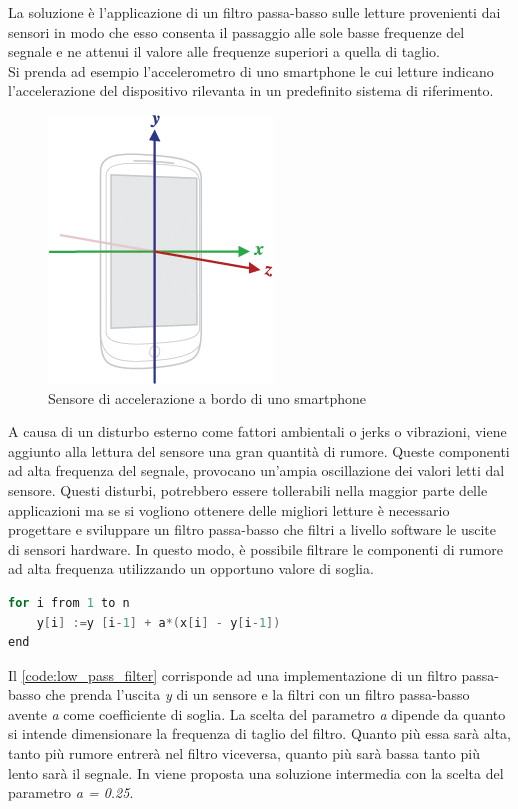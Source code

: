 La soluzione è l'applicazione di un filtro passa-basso sulle letture provenienti dai sensori in modo che esso consenta il passaggio alle sole basse frequenze del segnale e ne attenui il valore alle frequenze superiori a quella di taglio.\\
Si prenda ad esempio l'accelerometro di uno smartphone le cui letture indicano l'accelerazione del dispositivo rilevanta in un predefinito sistema di riferimento.
\begin{figure}
	\begin{center}
		\includegraphics[width=0.3\columnwidth]{images/accelerometer}
	\end{center}
	\caption{Sensore di accelerazione a bordo di uno smartphone}
	\label{fig:accelerometer}
\end{figure}
A causa di un disturbo esterno come fattori ambientali o jerks o vibrazioni, viene aggiunto alla lettura del sensore una gran quantità di rumore. Queste componenti ad alta frequenza del segnale, provocano un'ampia oscillazione dei valori letti dal sensore. Questi disturbi, potrebbero essere tollerabili nella maggior parte delle applicazioni ma se si vogliono ottenere delle migliori letture è necessario progettare e sviluppare un filtro passa-basso che filtri a livello software le uscite di sensori hardware. In questo modo, è possibile filtrare le componenti di rumore ad alta frequenza utilizzando un opportuno valore di soglia.\\
\begin{lstlisting}[language=Java, label= code:low_pass_filter, caption=Pseudo-codice relativo all'implementazione di un filtro passa-basso]
for i from 1 to n
	y[i] :=y [i-1] + a*(x[i] - y[i-1])
end
\end{lstlisting}
Il \autoref{code:low_pass_filter} corrisponde ad una implementazione di un filtro passa-basso che prenda l'uscita \textit{y} di un sensore e la filtri con un filtro passa-basso avente \textit{a} come coefficiente di soglia.
La scelta del parametro \textit{a} dipende da quanto si intende dimensionare la frequenza di taglio del filtro. Quanto più essa sarà alta, tanto più rumore entrerà nel filtro viceversa, quanto più sarà bassa tanto più lento sarà il segnale. In \cite{developer:android} viene proposta una soluzione intermedia con la scelta del parametro \textit{a = 0.25}.


